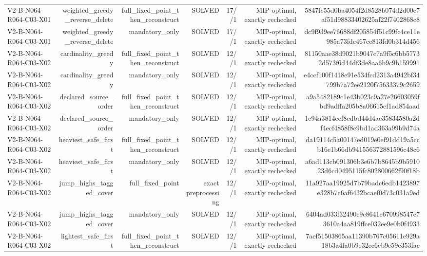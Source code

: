 {\begin{longtable}{lrrrrrr}
V2-B-N064-R064-C03-X01 & weighted\_greedy\_reverse\_delete & full\_fixed\_point\_then\_reconstruct & SOLVED & 17//1 & MIP-optimal, exactly rechecked & 5847fc55d0ba4054f2d8528b074d2d00e7af51d98833402625af22f7402868c8 \\
V2-B-N064-R064-C03-X01 & weighted\_greedy\_reverse\_delete & mandatory\_only & SOLVED & 17//1 & MIP-optimal, exactly rechecked & dc9f939ee76688df205854f51c99fc4ce11e985a73fdc467ce813fd0b314d456 \\
V2-B-N064-R064-C03-X02 & cardinality\_greedy & full\_fixed\_point\_then\_reconstruct & SOLVED & 12//1 & MIP-optimal, exactly rechecked & 81150aae38d9021b9047c7a9f5c6bb57732d573f6d44df3de8aa6b9c9b159991 \\
V2-B-N064-R064-C03-X02 & cardinality\_greedy & mandatory\_only & SOLVED & 12//1 & MIP-optimal, exactly rechecked & e4ccf100f1418e91e534fcd2313a4942bf34799b7a72ee2120f75633379c2659 \\
V2-B-N064-R064-C03-X02 & declared\_source\_order & full\_fixed\_point\_then\_reconstruct & SOLVED & 12//1 & MIP-optimal, exactly rechecked & a9a5482189c1e43b023c9a27e26603059fbd9adffa205b8a06615ef1ad854aad \\
V2-B-N064-R064-C03-X02 & declared\_source\_order & mandatory\_only & SOLVED & 12//1 & MIP-optimal, exactly rechecked & 1c94a3814eef8edbd44d4ac35834580a2df4ecf4858f8c9bd1ad363a99b9d74a \\
V2-B-N064-R064-C03-X02 & heaviest\_safe\_first & full\_fixed\_point\_then\_reconstruct & SOLVED & 12//1 & MIP-optimal, exactly rechecked & da19114c5a00147ed019e0ef91dd19a5ccb16e1b66db941556372881596c48c6 \\
V2-B-N064-R064-C03-X02 & heaviest\_safe\_first & mandatory\_only & SOLVED & 12//1 & MIP-optimal, exactly rechecked & a6ad113cb091306b3e6b7b8645b9b591023d6cd0495115fc802800662f90f18b \\
V2-B-N064-R064-C03-X02 & jump\_highs\_tagged\_cover & full\_fixed\_point & exact preprocessing & 12//1 & MIP-optimal, exactly rechecked & 11a927aa19925d7b79badc6edb1423897e328b7c6af6432bcaef0d73c031a9ed \\
V2-B-N064-R064-C03-X02 & jump\_highs\_tagged\_cover & mandatory\_only & SOLVED & 12//1 & MIP-optimal, exactly rechecked & 6404ad033f32490c9c8641e670998547e73610a4aa819ffce032ee9e0b0f4933 \\
V2-B-N064-R064-C03-X02 & lightest\_safe\_first & full\_fixed\_point\_then\_reconstruct & SOLVED & 12//1 & MIP-optimal, exactly rechecked & 7aef51503865aa11390b767c05611e929a18b3a4fa0b9e32ec6cb9e59c353fac \\

\end{longtable}}
